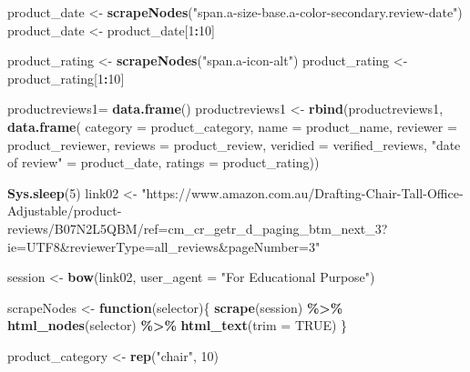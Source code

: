 \documentclass[
]{article}
\newenvironment{Shaded}{\begin{snugshade}}{\end{snugshade}}
\newcommand{\AttributeTok}[1]{\textcolor[rgb]{0.13,0.29,0.53}{#1}}
\newcommand{\ConstantTok}[1]{\textcolor[rgb]{0.56,0.35,0.01}{#1}}
\newcommand{\ControlFlowTok}[1]{\textcolor[rgb]{0.13,0.29,0.53}{\textbf{#1}}}
\newcommand{\DecValTok}[1]{\textcolor[rgb]{0.00,0.00,0.81}{#1}}
\newcommand{\FunctionTok}[1]{\textcolor[rgb]{0.13,0.29,0.53}{\textbf{#1}}}
\newcommand{\NormalTok}[1]{#1}
\newcommand{\OtherTok}[1]{\textcolor[rgb]{0.56,0.35,0.01}{#1}}
\newcommand{\SpecialCharTok}[1]{\textcolor[rgb]{0.81,0.36,0.00}{\textbf{#1}}}
\newcommand{\StringTok}[1]{\textcolor[rgb]{0.31,0.60,0.02}{#1}}
\begin{document}
\begin{Shaded}
\begin{Highlighting}[]
\NormalTok{  product\_date }\OtherTok{\textless{}{-}} \FunctionTok{scrapeNodes}\NormalTok{(}\StringTok{"span.a{-}size{-}base.a{-}color{-}secondary.review{-}date"}\NormalTok{)}
\NormalTok{  product\_date }\OtherTok{\textless{}{-}}\NormalTok{ product\_date[}\DecValTok{1}\SpecialCharTok{:}\DecValTok{10}\NormalTok{]}
  
\NormalTok{  product\_rating }\OtherTok{\textless{}{-}} \FunctionTok{scrapeNodes}\NormalTok{(}\StringTok{"span.a{-}icon{-}alt"}\NormalTok{)}
\NormalTok{  product\_rating }\OtherTok{\textless{}{-}}\NormalTok{ product\_rating[}\DecValTok{1}\SpecialCharTok{:}\DecValTok{10}\NormalTok{]}
  
\NormalTok{  productreviews1}\OtherTok{=} \FunctionTok{data.frame}\NormalTok{()}
\NormalTok{  productreviews1 }\OtherTok{\textless{}{-}} \FunctionTok{rbind}\NormalTok{(productreviews1, }\FunctionTok{data.frame}\NormalTok{(}
                      \AttributeTok{category =}\NormalTok{ product\_category,}
                      \AttributeTok{name =}\NormalTok{ product\_name,}
                      \AttributeTok{reviewer =}\NormalTok{ product\_reviewer,}
                      \AttributeTok{reviews =}\NormalTok{ product\_review,}
                      \AttributeTok{veridied =}\NormalTok{ verified\_reviews,}
                      \StringTok{"date of review"} \OtherTok{=}\NormalTok{ product\_date,}
                      \AttributeTok{ratings =}\NormalTok{ product\_rating))}

  
 \FunctionTok{Sys.sleep}\NormalTok{(}\DecValTok{5}\NormalTok{)}
\NormalTok{link02 }\OtherTok{\textless{}{-}} \StringTok{"https://www.amazon.com.au/Drafting{-}Chair{-}Tall{-}Office{-}Adjustable/product{-}reviews/B07N2L5QBM/ref=cm\_cr\_getr\_d\_paging\_btm\_next\_3?ie=UTF8\&reviewerType=all\_reviews\&pageNumber=3"}


\NormalTok{  session }\OtherTok{\textless{}{-}} \FunctionTok{bow}\NormalTok{(link02,}
               \AttributeTok{user\_agent =} \StringTok{"For Educational Purpose"}\NormalTok{)}

\NormalTok{  scrapeNodes }\OtherTok{\textless{}{-}} \ControlFlowTok{function}\NormalTok{(selector)\{}
    \FunctionTok{scrape}\NormalTok{(session) }\SpecialCharTok{\%\textgreater{}\%}
      \FunctionTok{html\_nodes}\NormalTok{(selector) }\SpecialCharTok{\%\textgreater{}\%}
      \FunctionTok{html\_text}\NormalTok{(}\AttributeTok{trim =} \ConstantTok{TRUE}\NormalTok{)}
\NormalTok{  \}}

\NormalTok{  product\_category }\OtherTok{\textless{}{-}} \FunctionTok{rep}\NormalTok{(}\StringTok{"chair"}\NormalTok{, }\DecValTok{10}\NormalTok{)}


\end{Highlighting}
\end{Shaded}
\end{document}
